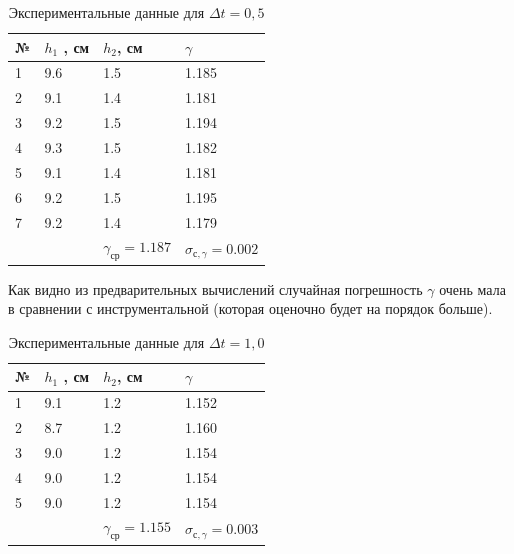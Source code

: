 \documentclass[a4paper,12pt]{article}
\begin{document}
\begin{table}[h!] 
	\caption{Экспериментальные данные для $\Delta t = 0,5$}
	\begin{center}
	\begin{tabular}{|*{4}{l|}}
		\hline
	№ & $h_1$ , см & $h_2$, см & $\gamma$ \\ \hline
	1& 9.6& 1.5 & 1.185 \\ \hline
	2 & 9.1 & 1.4 & 1.181 \\ \hline
	3 & 9.2 & 1.5 & 1.194 \\ \hline
	4 & 9.3 & 1.5 & 1.182 \\ \hline
	5 & 9.1 & 1.4 & 1.181 \\ \hline 
	6 & 9.2 & 	1.5 & 1.195 \\ \hline
	7 & 9.2 & 1.4 & 1.179 \\ \hline 
	& & $\gamma_{ср} = 1.187 $ & $\sigma_{с, \gamma} = 0.002$ \\ \hline
	\end{tabular}
	\end{center}
\end{table}

Как видно из предварительных вычислений случайная погрешность $\gamma$ очень мала в сравнении с инструментальной (которая оценочно будет на порядок больше). 



\begin{table}[h!] 
	\caption{Экспериментальные данные для $\Delta t = 1,0$}
	\begin{center}
		\begin{tabular}{|*{4}{l|}}
			\hline
			№ & $h_1$ , см& $h_2$, см & $\gamma$ \\ \hline
			1 & 9.1 & 1.2 & 1.152 \\ \hline
			2 & 8.7 & 1.2 & 1.160 \\ \hline 
			3 & 9.0 & 1.2 & 1.154 \\ \hline
			4 & 9.0 & 1.2 & 1.154 \\ \hline
			5 & 9.0 & 1.2 & 1.154 \\ \hline
			& & $\gamma_{ср} = 1.155 $ & $\sigma_{с, \gamma} = 0.003$ \\ \hline
		\end{tabular}
	\end{center}
\end{table}
\end{document}
